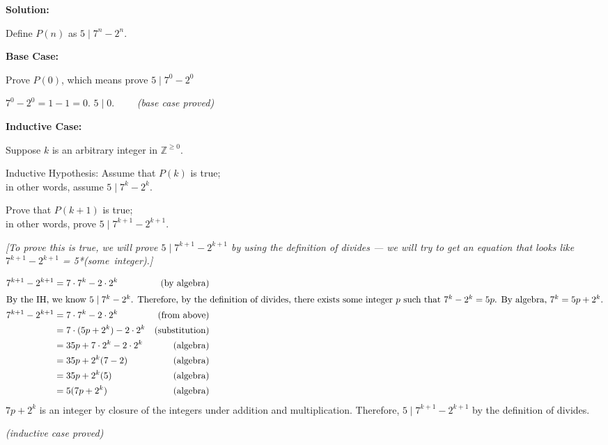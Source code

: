 \documentclass[11pt, letterpaper]{report}
\newcommand{\Z}{\mathbb{Z}}
\begin{document}
\begin{enumerate}
\textbf{Solution:}

Define $P(n)$ as $5 \mid 7^n - 2^n$.

\textbf{Base Case:}

Prove $P(0)$, which means prove $5 \mid 7^0 - 2^0$

$7^0-2^0 = 1-1=0$.  $5 \mid 0$.  \ \ \checkmark \ \
 \textit{(base case proved)}

\textbf{Inductive Case:}

Suppose $k$ is an arbitrary integer in $ \Z^{\geq 0}$.

\medskip

Inductive Hypothesis: Assume that $P(k)$ is true; \\in other words, assume
$5 \mid 7^k - 2^k$.

Prove that $P(k+1)$ is true; \\ \medskip in other words, prove
$5 \mid 7^{k+1} - 2^{k+1}$.

\textit{[To prove this is true, we will prove $5 \mid 7^{k+1} - 2^{k+1}$  by using the definition of divides --- we will try
to get an equation that looks like $7^{k+1} - 2^{k+1}$ = 5*(some\ integer).]}

\begin{align*}
7^{k+1} - 2^{k+1} &=  7\cdot 7^{k} - 2\cdot 2^{k}  & \text{(by algebra)}\\
\intertext{By the IH, we know $5 \mid 7^k - 2^k$.  Therefore, by the definition of divides, there exists some integer $p$
such that $7^k - 2^k=5p$. By algebra, $7^k=5p+2^k$.}
7^{k+1} - 2^{k+1} &=  7\cdot 7^{k} - 2\cdot 2^{k}  & \text{(from above)}\\
&= 7\cdot (5p+2^k) - 2\cdot 2^{k} & \text{(substitution)}\\
&= 35p + 7\cdot 2^k - 2\cdot 2^{k} & \text{(algebra)}\\
&= 35p + 2^k(7- 2) & \text{(algebra)}\\
&= 35p + 2^k(5) & \text{(algebra)}\\
&= 5(7p + 2^k) & \text{(algebra)}
\end{align*}
$7p + 2^k$ is an integer by closure of the integers under addition and multiplication.  Therefore, $5\mid 7^{k+1} - 2^{k+1}$ 
by the definition of divides.

\textit{(inductive case proved)}


\end{enumerate}
\end{document}
